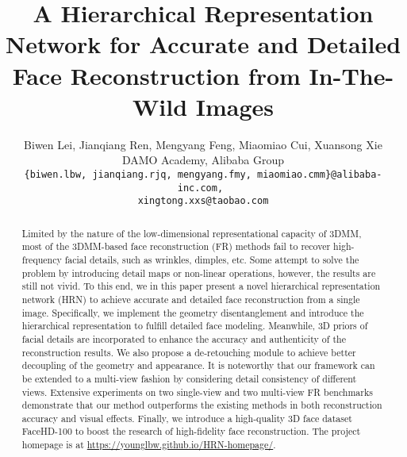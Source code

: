 \documentclass[10pt,twocolumn,letterpaper]{article}
\title{A Hierarchical Representation Network for Accurate and Detailed Face Reconstruction from In-The-Wild Images}
\author{Biwen Lei, Jianqiang Ren, Mengyang Feng, Miaomiao Cui, Xuansong Xie\\
DAMO Academy, Alibaba Group\\
{\tt\small \{biwen.lbw, jianqiang.rjq, mengyang.fmy, miaomiao.cmm\}@alibaba-inc.com, }\\
{\tt\small xingtong.xxs@taobao.com}
}
\begin{document}
\twocolumn[{
\renewcommand\twocolumn[1][]{#1}
\maketitle
\vspace{-30pt}
\begin{center}
    \centering
    \captionsetup{type=figure}
    \texttt{[image: figures/first\_page\_figure.pdf]}
\captionof{figure}{Example of low-frequency geometry, MF, HF facial details and the hierarchical representation.}
    \label{fig: first_page}
\end{center}
}]







\begin{abstract}
\vspace{-10pt}

 Limited by the nature of the low-dimensional representational capacity of 3DMM, most of the 3DMM-based face reconstruction (FR) methods fail to recover high-frequency facial details, such as wrinkles, dimples, etc. Some attempt to solve the problem by introducing detail maps or non-linear operations, however, the results are still not vivid. To this end, we in this paper present a novel hierarchical representation network (HRN) to achieve accurate and detailed face reconstruction from a single image. Specifically, we implement the geometry disentanglement and introduce the hierarchical representation to fulfill detailed face modeling. Meanwhile, 3D priors of facial details are incorporated to enhance the accuracy and authenticity of the reconstruction results. We also propose a de-retouching module to achieve better decoupling of the geometry and appearance. It is noteworthy that our framework can be extended to a multi-view fashion by considering detail consistency of different views. Extensive experiments on two single-view and two multi-view FR benchmarks demonstrate that our method outperforms the existing methods in both reconstruction accuracy and visual effects. Finally, we introduce a high-quality 3D face dataset FaceHD-100 to boost the research of high-fidelity face reconstruction. The project homepage is at \href{https://younglbw.github.io/HRN-homepage/}{https://younglbw.github.io/HRN-homepage/}.



\end{abstract}
\end{document}
